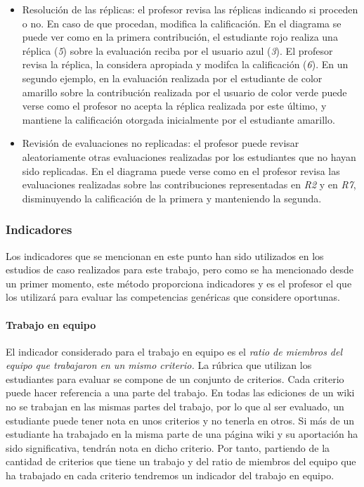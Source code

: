 \begin{itemize}
\item Resolución de las réplicas: el profesor revisa las réplicas indicando si proceden o no. En caso de que procedan, modifica la calificación. En el diagrama se puede ver como en la primera contribución, el estudiante rojo realiza una réplica (\emph{5}) sobre la evaluación reciba por el usuario azul (\emph{3}). El profesor revisa la réplica, la considera apropiada y modifca la calificación (\emph{6}). En un segundo ejemplo, en la evaluación realizada por el estudiante de color amarillo sobre la contribución realizada por el usuario de color verde puede verse como el profesor no acepta la réplica realizada por este último, y mantiene la calificación otorgada inicialmente por el estudiante amarillo.
\item Revisión de evaluaciones no replicadas: el profesor puede revisar aleatoriamente otras evaluaciones realizadas por los estudiantes que no hayan sido replicadas. En el diagrama puede verse como en el profesor revisa las evaluaciones realizadas sobre las contribuciones representadas en \emph{R2} y en \emph{R7}, disminuyendo la calificación de la primera y manteniendo la segunda.
\end{itemize}

\subsubsection{Indicadores}

Los indicadores que se mencionan en este punto han sido utilizados en los estudios de caso realizados para este trabajo, pero como se ha mencionado desde un primer momento, este método proporciona indicadores y es el profesor el que los utilizará para evaluar las competencias genéricas que considere oportunas.

\paragraph*{Trabajo en equipo}
El indicador considerado para el trabajo en equipo es el \emph{ratio de miembros del equipo que trabajaron en un mismo criterio.} La rúbrica que utilizan los estudiantes para evaluar se compone de un conjunto de criterios. Cada criterio puede hacer referencia a una parte del trabajo. En todas las ediciones de un wiki no se trabajan en las mismas partes del trabajo, por lo que al ser evaluado, un estudiante puede tener nota en unos criterios y no tenerla en otros. Si más de un estudiante ha trabajado en la misma parte de una página wiki y su aportación ha sido significativa, tendrán nota en dicho criterio. Por tanto, partiendo de la cantidad de criterios que tiene un trabajo y del ratio de miembros del equipo que ha trabajado en cada criterio tendremos un indicador del trabajo en equipo.

